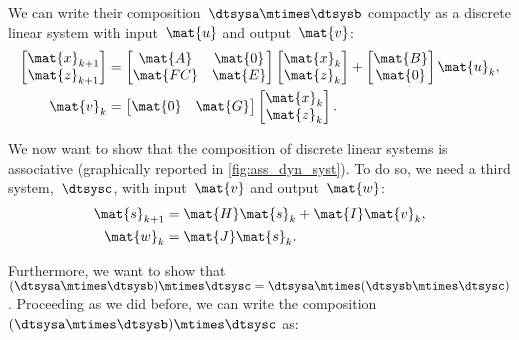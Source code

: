 We can write their composition~$\dtsysa\mtimes \dtsysb$ compactly as a discrete linear system with input~$\mat{u}$ and output~$\mat{v}$:
%
\begin{equation*}
    \label{eq:dlin-3}
    \begin{aligned}
        \begin{bmatrix}
            \mat{x}_{k+1} \\
            \mat{z}_{k+1}
        \end{bmatrix} & =
        \begin{bmatrix}
            \mat{A}  & \mat{0} \\
            \mat{FC} & \mat{E}
        \end{bmatrix}
        \begin{bmatrix}
            \mat{x}_k \\ \mat{z}_k
        \end{bmatrix}
        +
        \begin{bmatrix}
            \mat{B} \\ \mat{0}
        \end{bmatrix}\mat{u}_k, \\
        \mat{v}_k        & =
        \begin{bmatrix}
            \mat{0} & \mat{G}
        \end{bmatrix}
        \begin{bmatrix}
            \mat{x}_k \\ \mat{z}_k
        \end{bmatrix}.
    \end{aligned}
\end{equation*}

We now want to show that the composition of discrete linear systems is associative (graphically reported in \cref{fig:ass_dyn_syst}).
To do so, we need a third system,~$\dtsysc$, with input~$\mat{v}$ and output~$\mat{w}$:
\begin{equation*}
    \label{eq:dlin-4}
    \begin{aligned}
        \mat{s}_{k+1} & = \mat{H} \mat{s}_k + \mat{I} \mat{v}_k, \\
        \mat{w}_{k}   & = \mat{J} \mat{s}_k.
    \end{aligned}
\end{equation*}

Furthermore, we want to show that~$(\dtsysa\mtimes \dtsysb)\mtimes \dtsysc=\dtsysa\mtimes (\dtsysb\mtimes \dtsysc)$.
Proceeding as we did before, we can write the composition~$(\dtsysa\mtimes \dtsysb)\mtimes \dtsysc$ as:

